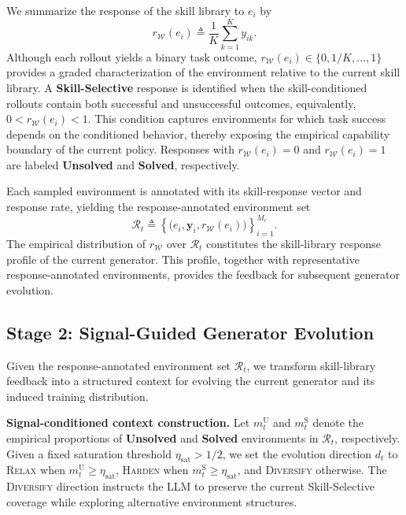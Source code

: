 \documentclass[conference]{IEEEtran}
\begin{document}
We summarize the response of the skill library to $e_i$ by
\begin{equation}
 r_{\mathcal W}(e_i)
 \triangleq
 \frac{1}{K}\sum_{k=1}^{K}y_{ik}.
 \label{eq:skill-library-response}
\end{equation}
Although each rollout yields a binary task outcome,
$r_{\mathcal W}(e_i)\in\{0,1/K,\ldots,1\}$ provides a graded characterization of
the environment relative to the current skill library. A
\textbf{Skill-Selective} response is identified when the skill-conditioned
rollouts contain both successful and unsuccessful outcomes, equivalently,
$0<r_{\mathcal W}(e_i)<1$. This condition captures environments for which task
success depends on the conditioned behavior, thereby exposing the empirical
capability boundary of the current policy. Responses with
$r_{\mathcal W}(e_i)=0$ and $r_{\mathcal W}(e_i)=1$ are labeled \textbf{Unsolved}
and \textbf{Solved}, respectively.

Each sampled environment is annotated with its skill-response vector and
response rate, yielding the response-annotated environment set
\begin{equation}
 \mathcal R_t
 \triangleq
 \left\{
 \bigl(
 e_i,\mathbf y_i,r_{\mathcal W}(e_i)
 \bigr)
 \right\}_{i=1}^{M_c}.
 \label{eq:response-annotated-environments}
\end{equation}
The empirical distribution of $r_{\mathcal W}$ over $\mathcal R_t$ constitutes
the skill-library response profile of the current generator. This profile,
together with representative response-annotated environments, provides the
feedback for subsequent generator evolution.

\subsection{Stage 2: Signal-Guided Generator Evolution}
\label{sec:generation}

Given the response-annotated environment set $\mathcal R_t$, we transform
skill-library feedback into a structured context for evolving the current
generator and its induced training distribution.

\textbf{Signal-conditioned context construction.}
Let $m_t^{\mathrm U}$ and $m_t^{\mathrm S}$ denote the empirical proportions of
\textbf{Unsolved} and \textbf{Solved} environments in $\mathcal R_t$,
respectively. Given a fixed saturation threshold
$\eta_{\mathrm{sat}}>1/2$, we set the evolution direction $d_t$ to
\textsc{Relax} when $m_t^{\mathrm U}\geq\eta_{\mathrm{sat}}$,
\textsc{Harden} when $m_t^{\mathrm S}\geq\eta_{\mathrm{sat}}$, and
\textsc{Diversify} otherwise. The \textsc{Diversify} direction instructs the LLM
to preserve the current Skill-Selective coverage while exploring alternative
environment structures.
\end{document}

